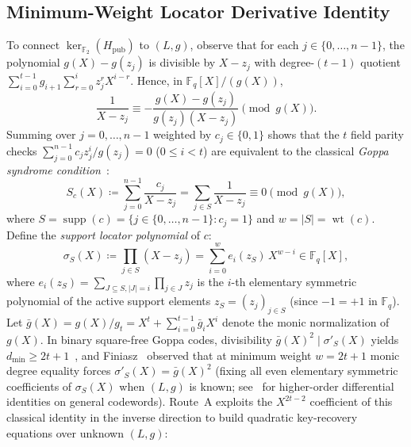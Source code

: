 \documentclass[11pt,a4paper]{article}
\theoremstyle{definition}
\theoremstyle{remark}
\newcommand{\F}{\mathbb{F}}
\newcommand{\wt}{\operatorname{wt}}
\newcommand{\supp}{\operatorname{supp}}
\begin{document}
\subsection{Minimum-Weight Locator Derivative Identity}
To connect $\ker_{\F_2}(H_{\text{pub}})$ to $(L, g)$, observe that for each $j \in \{0, \dots, n-1\}$, the polynomial $g(X) - g(z_j)$ is divisible by $X - z_j$ with degree-$(t-1)$ quotient $\sum_{i=0}^{t-1} g_{i+1}\sum_{r=0}^i z_j^r X^{i-r}$. Hence, in $\F_q[X]/(g(X))$,
\[
    \frac{1}{X - z_j} \equiv -\frac{g(X) - g(z_j)}{g(z_j)(X - z_j)} \pmod{g(X)}.
\]
Summing over $j = 0, \dots, n-1$ weighted by $c_j \in \{0, 1\}$ shows that the $t$ field parity checks $\sum_{j=0}^{n-1} c_j z_j^i / g(z_j) = 0$ ($0 \le i < t$) are equivalent to the classical \emph{Goppa syndrome condition}~\cite{Pat75,MS77}:
\begin{equation}
\label{eq:goppa-syndrome}
    S_c(X) \coloneqq \sum_{j=0}^{n-1} \frac{c_j}{X - z_j} = \sum_{j \in S} \frac{1}{X - z_j} \equiv 0 \pmod{g(X)},
\end{equation}
where $S = \supp(c) = \{j \in \{0, \dots, n-1\} : c_j = 1\}$ and $w = |S| = \wt(c)$. Define the \emph{support locator polynomial} of $c$:
\begin{equation}
\label{eq:locator-def}
    \sigma_S(X) \coloneqq \prod_{j \in S} (X - z_j) = \sum_{i=0}^w e_i(z_S)\, X^{w - i} \in \F_q[X],
\end{equation}
where $e_i(z_S) = \sum_{J \subseteq S, |J|=i} \prod_{j \in J} z_j$ is the $i$-th elementary symmetric polynomial of the active support elements $z_S = (z_j)_{j \in S}$ (since $-1 = +1$ in $\F_q$). Let $\bar{g}(X) = g(X) / g_t = X^t + \sum_{i=0}^{t-1} \bar{g}_i X^i$ denote the monic normalization of $g(X)$. In binary square-free Goppa codes, divisibility $\bar{g}(X)^2 \mid \sigma'_S(X)$ yields $d_{\min} \ge 2t + 1$~\cite{Pat75,MS77}, and Finiasz~\cite{Fin03} observed that at minimum weight $w = 2t + 1$ monic degree equality forces $\sigma'_S(X) = \bar{g}(X)^2$ (fixing all even elementary symmetric coefficients of $\sigma_S(X)$ when $(L, g)$ is known; see~\cite{Ved26,Wei26} for higher-order differential identities on general codewords). Route~A exploits the $X^{2t-2}$ coefficient of this classical identity in the inverse direction to build quadratic key-recovery equations over unknown $(L, g)$:
\end{document}
